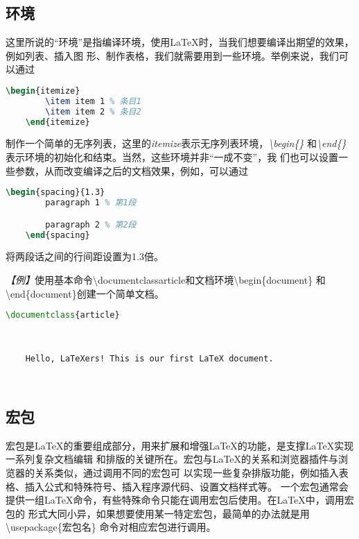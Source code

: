 \subsection{环境}
这里所说的“环境”是指编译环境，使用LaTeX时，当我们想要编译出期望的效果，例如列表、插入图
形、制作表格，我们就需要用到一些环境。举例来说，我们可以通过
\begin{lstlisting}[language=TeX]
    \begin{itemize}
        \item item 1 % 条目1
        \item item 2 % 条目2
    \end{itemize}
\end{lstlisting}

制作一个简单的无序列表，这里的\emph{itemize}表示无序列表环境，\emph{\textbackslash begin\{\}}
和\emph{\textbackslash end\{\}}表示环境的初始化和结束。当然，这些环境并非“一成不变”，我
们也可以设置一些参数，从而改变编译之后的文档效果，例如，可以通过
\begin{lstlisting}[language=TeX]
    \begin{spacing}{1.3}
        paragraph 1 % 第1段

        paragraph 2 % 第2段
    \end{spacing}
\end{lstlisting}
将两段话之间的行间距设置为1.3倍。

\emph{【例】}使用基本命令\textbackslash documentclass{article}和文档环境\textbackslash begin\{document\}
和\textbackslash end\{document\}创建一个简单文档。
\begin{lstlisting}[language=TeX]
    \documentclass{article}

    

    Hello, LaTeXers! This is our first LaTeX document.

    
\end{lstlisting}

\subsection{宏包}
宏包是LaTeX的重要组成部分，用来扩展和增强LaTeX的功能，是支撑LaTeX实现一系列复杂文档编辑
和排版的关键所在。宏包与LaTeX的关系和浏览器插件与浏览器的关系类似，通过调用不同的宏包可
以实现一些复杂排版功能，例如插入表格、插入公式和特殊符号、插入程序源代码、设置文档样式等。
一个宏包通常会提供一组LaTeX命令，有些特殊命令只能在调用宏包后使用。在LaTeX中，调用宏包的
形式大同小异，如果想要使用某一特定宏包，最简单的办法就是用\textbackslash usepackage\{宏包名\}
命令对相应宏包进行调用。

